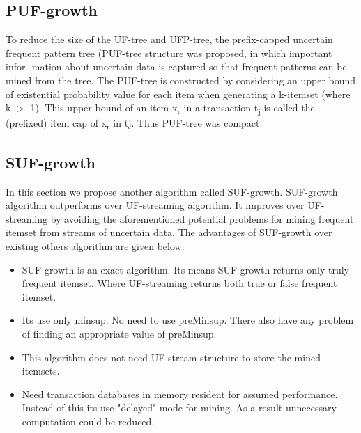\documentclass[a4paper,12pt]{book}
\begin{document}
\subsection{PUF-growth}
To reduce the size of the UF-tree and UFP-tree, the preﬁx-capped uncertain frequent pattern tree (PUF-tree  structure was proposed, in which important infor- mation about uncertain data is captured so that frequent patterns can be mined from the tree. The PUF-tree  is constructed by considering an upper bound of existential probability value for each item when generating a k-itemset (where k $>$ 1). This upper bound of an item x\textsubscript{r} in a transaction t\textsubscript{j} is called the (preﬁxed) item cap of x\textsubscript{r} in tj. Thus PUF-tree was compact.
\subsection{SUF-growth}
In this section we propose another algorithm called SUF-growth. SUF-growth algorithm outperforms over UF-streaming algorithm. It improves over UF-streaming by avoiding the aforementioned potential problems for mining frequent itemset from streams of uncertain data. The advantages of SUF-growth over existing others algorithm are given below:
\begin{itemize}
 \item SUF-growth is an exact algorithm. Its means SUF-growth returns only truly frequent itemset. Where UF-streaming returns both true or false frequent itemset.
  \item Its use only minsup. No need to use preMinsup. There also have any problem of finding an appropriate value of preMinsup.
  \item This algorithm does not need UF-stream structure to store the mined itemsets.
  \item Need transaction databases in memory resident for assumed performance. Instead of this its use "delayed" mode for mining. As a result unnecessary computation could be reduced.
\end{itemize}
\end{document}
